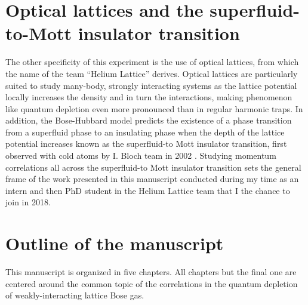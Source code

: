 \section*{Optical lattices and the superfluid-to-Mott insulator transition}

The other specificity of this experiment is the use of optical lattices, from which the name of the team ``Helium Lattice'' derives. Optical lattices are particularly suited to study many-body, strongly interacting systems as the lattice potential locally increases the density and in turn the interactions, making phenomenon like quantum depletion even more pronounced than in regular harmonic traps. In addition, the Bose-Hubbard model predicts the existence of a phase transition from a superfluid phase to an insulating phase when the depth of the lattice potential increases known as the superfluid-to Mott insulator transition, first observed with cold atoms by I. Bloch team in 2002 \cite{greiner2002quantum}. Studying momentum correlations all across the superfluid-to Mott insulator transition sets the general frame of the work presented in this manuscript conducted during my time as an intern and then PhD student in the Helium Lattice team that I the chance to join in 2018.

\section*{Outline of the manuscript}

This manuscript is organized in five chapters. All chapters but the final one are centered around the common topic of the \kmk correlations in the quantum depletion of weakly-interacting lattice Bose gas.

